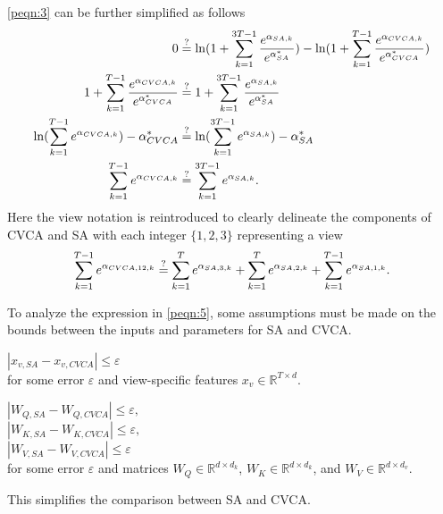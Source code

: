 \ref{peqn:3} can be further simplified as follows
\begin{align}
    0 & \stackrel{?}{=} \ln (1 + \sum_{k=1}^{3T-1} \frac{e^{\alpha_{SA,k}}}{e^{\alpha^*_{SA}}}) - \ln (1 + \sum_{k=1}^{T-1} \frac{e^{\alpha_{CVCA,k}}}{e^{\alpha^*_{CVCA}}}) \nonumber \\
    1 + \sum_{k=1}^{T-1} \frac{e^{\alpha_{CVCA,k}}}{e^{\alpha^*_{CVCA}}} & \stackrel{?}{=} 1 + \sum_{k=1}^{3T-1} \frac{e^{\alpha_{SA,k}}}{e^{\alpha^*_{SA}}} \nonumber \\
    \ln (\sum_{k=1}^{T-1} e^{\alpha_{CVCA,k}}) - \alpha^*_{CVCA} & \stackrel{?}{=} \ln (\sum_{k=1}^{3T-1} e^{\alpha_{SA,k}}) - \alpha^*_{SA} \nonumber \\
    \sum_{k=1}^{T-1} e^{\alpha_{CVCA,k}}  & \stackrel{?}{=} \sum_{k=1}^{3T-1} e^{\alpha_{SA,k}}. \label{peqn:4}
\end{align}
Here the view notation is reintroduced to clearly delineate the components of CVCA and SA with each integer $\{1,2,3\}$ representing a view
\begin{equation}
    \sum_{k=1}^{T-1} e^{\alpha_{CVCA,12,k}}  \stackrel{?}{=} \sum_{k=1}^{T} e^{\alpha_{SA,3,k}} + \sum_{k=1}^{T} e^{\alpha_{SA,2,k}} + \sum_{k=1}^{T-1} e^{\alpha_{SA,1,k}}. \\
\label{peqn:5}
\end{equation}

To analyze the expression in \ref{peqn:5}, some assumptions must be made on the bounds between the inputs and parameters for SA and CVCA.
\begin{assumption}
    $| x_{v,SA} - x_{v,CVCA} | \leq \varepsilon$ \\
    for some error $\varepsilon$ and view-specific features $x_v \in \mathbb{R}^{T \times d}$.
\label{pass:2}
\end{assumption}
\begin{assumption}
    $| W_{Q,SA} - W_{Q,CVCA} | \leq \varepsilon,$ \\
    $| W_{K,SA} - W_{K,CVCA} | \leq \varepsilon,$ \\
    $| W_{V,SA} - W_{V,CVCA} | \leq \varepsilon$ \\
    for some error $\varepsilon$ and matrices $W_Q \in \mathbb{R}^{d \times d_k}$, $W_K \in \mathbb{R}^{d \times d_k}$, and $W_V \in \mathbb{R}^{d \times d_v}$.
\label{pass:3}
\end{assumption}
This simplifies the comparison between SA and CVCA.

